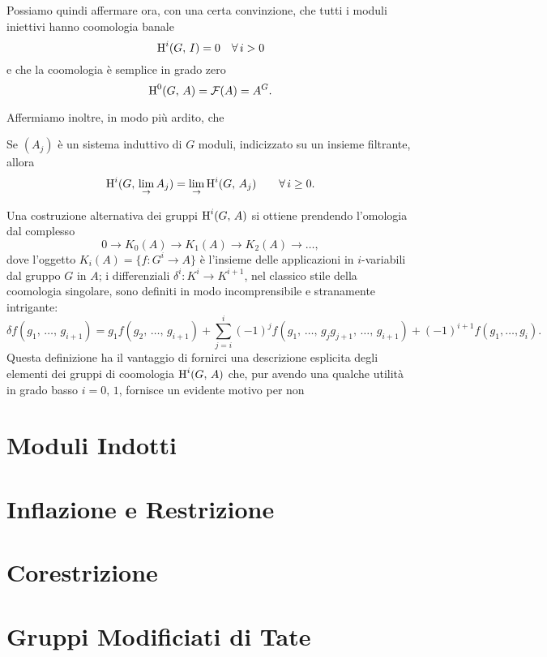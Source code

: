 Possiamo quindi affermare ora, con una certa convinzione, che tutti i moduli iniettivi hanno coomologia banale
\[ \operatorname{H}^i(G, \, I) = 0 \quad \forall \, i > 0 \]
e che la coomologia è semplice in grado zero
$$  \operatorname{H}^0(G, \, A) = \mathcal{F}(A) = A^G.  $$

Affermiamo inoltre, in modo più ardito, che
\begin{proposition} 
	Se $ (A_j) $ è un sistema induttivo di $ G $ moduli, indicizzato su un insieme filtrante, allora
	\[ \operatorname{H}^i(G, \, \lim_\rightarrow A_j) = \lim_\rightarrow \operatorname{H}^i(G, \, A_j) \qquad \forall \, i \geq 0. \] 
\end{proposition} 

Una costruzione alternativa dei gruppi $ \operatorname{H}^i(G, \, A) $ si ottiene prendendo l'omologia dal complesso
\[ 0 \to K_0(A) \to K_1(A) \to K_2 (A) \to \dots, \]
dove l'oggetto $ K_i(A) = \{ f \colon G^i \to A\} $ è l'insieme delle applicazioni in $ i $-variabili dal gruppo $ G $ in $ A $; i differenziali $ \delta^i \colon K^i \to K^{i+1} $, nel classico stile della coomologia singolare, sono definiti in modo incomprensibile e stranamente intrigante:
\[ \delta f(g_1, \, \dots, \, g_{i+1}) = g_1 f(g_2, \, \dots, \, g_{i+1}) + \sum_{j = i}^{i} (-1)^j f(g_1, \, \dots, \, g_jg_{j+1}, \, \dots, \, g_{i+1}) + (-1)^{i+1} f(g_1, \dots, g_i). \]
Questa definizione ha il vantaggio di fornirci una descrizione esplicita degli elementi dei gruppi di coomologia $ \operatorname{H}^i(G, \, A) $ che, pur avendo una qualche utilità in grado basso $ i = 0,\, 1 $, fornisce un evidente motivo per non 


\section{Moduli Indotti}


\newpage
\section{Inflazione e Restrizione}

\section{Corestrizione}

\section{Gruppi Modificiati di Tate}